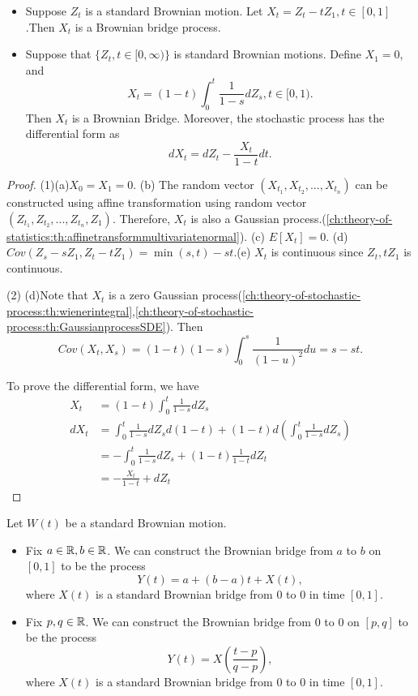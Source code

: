 \begin{refsection}
\begin{lemma}\hfill
	\begin{itemize}
		\item Suppose $Z_t$ is a standard Brownian motion. Let $X_t = Z_t - tZ_1,t\in [0,1]$.Then $X_t$ is a Brownian bridge process.
		\item Suppose that $\{Z_t,t\in[0,\infty)\}$ is standard Brownian motions. Define $X_1=0$, and
		$$X_t = (1-t)\int_0^t\frac{1}{1-s}dZ_s,t\in [0,1).$$
		Then $X_t$ is a Brownian Bridge. Moreover, the stochastic process has the differential form as
		$$dX_t = dZ_t - \frac{X_t}{1-t}dt.$$ 
		
	\end{itemize}	
\end{lemma}
\begin{proof}
	(1)(a)$X_0 = X_1 = 0$. (b) The random vector $(X_{t_1},X_{t_2},...,X_{t_n})$ can be constructed using affine transformation using random vector $(Z_{t_1},Z_{t_2},...,Z_{t_n},Z_1)$. Therefore, $X_t$ is also a Gaussian process.(\autoref{ch:theory-of-statistics:th:affinetransformmultivariatenormal}). (c) $E[X_t] = 0$. (d) $Cov(Z_s-sZ_1,Z_t-tZ_1) = \min(s,t)-st$.(e) $X_t$ is continuous since $Z_t, tZ_1$ is continuous. 	
	
	(2)	
	(d)Note that $X_t$ is a zero Gaussian process(\autoref{ch:theory-of-stochastic-process:th:wienerintegral},\autoref{ch:theory-of-stochastic-process:th:GaussianprocessSDE}). Then
	$$Cov(X_t,X_s) = (1-t)(1-s)\int_0^s \frac{1}{(1-u)^2}du = s-st.$$
	
	To prove the differential form, we have
	\begin{align*}
	X_t &= (1-t)\int_0^t\frac{1}{1-s}dZ_s \\
	dX_t &= \int_0^t\frac{1}{1-s}dZ_s d(1-t) + (1-t) d(\int_0^t\frac{1}{1-s}dZ_s) \\
	&= -\int_0^t\frac{1}{1-s}dZ_s + (1-t)\frac{1}{1-t}dZ_t \\
	&= - \frac{X_t}{1-t} + dZ_t
	\end{align*}
\end{proof}


\begin{lemma}
	Let $W(t)$ be a standard Brownian motion. 
	\begin{itemize}
		\item Fix $ a\in \mathbb{R}, b\in \mathbb{R}$. We can construct the Brownian bridge from $a$ to $b$ on $[0,1]$ to be the process 
		$$Y(t) = a + (b-a)t + X(t),$$
		where $X(t)$ is a standard Brownian bridge from 0 to 0 in time $[0,1]$.
		\item Fix $p, q\in \mathbb{R}$. We can construct the Brownian bridge from $0$ to $0$ on $[p,q]$ to be the process 
		$$Y(t) = X(\frac{t-p}{q-p}),$$
		where $X(t)$ is a standard Brownian bridge from 0 to 0 in time $[0,1]$.
		

\end{itemize}
\end{lemma}
\end{refsection}
